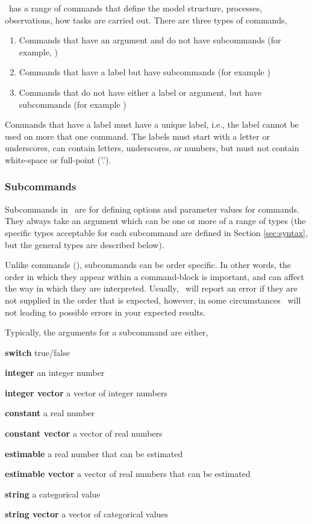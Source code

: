 \SPM\ has a range of commands that define the model structure, processes, observations, how tasks are carried out. There are three types of commands, 
\begin{enumerate}
\item Commands that have an argument and do not have subcommands (for example, )
\item Commands that have a label but have subcommands (for example )
\item Commands that do not have either a label or argument, but have subcommands (for example )
\end{enumerate}

Commands that have a label must have a unique label, i.e., the label cannot be used on more that one command. The labels must start with a letter or underscores, can contain letters, underscores, or numbers, but must not contain white-space or full-point ('.').

\subsubsection{Subcommands}

Subcommands in \SPM\ are for defining options and parameter values for commands. They always take an argument which can be one or more of a range of types (the specific types acceptable for each subcommand are defined in Section \ref{sec:syntax}, but the general types are described below). 

Unlike commands (), subcommands can be order specific. In other words, the order in which they appear within a command-block is important, and can affect the way in which they are interpreted. Usually, \SPM\ will report an error if they are not supplied in the order that is expected, however, in some circumstances \SPM\ will not \textemdash leading to possible errors in your expected results.  

Typically, the arguments for a subcommand are either,

\begin{description}
\item \textbf{switch} true/false 
\item \textbf{integer} an integer number
\item \textbf{integer vector} a vector of integer numbers
\item \textbf{constant} a real number 
\item \textbf{constant vector} a vector of real numbers
\item \textbf{estimable} a real number that can be estimated
\item \textbf{estimable vector} a vector of real numbers that can be estimated
\item \textbf{string} a categorical value
\item \textbf{string vector} a vector of categorical values
\end{description}

